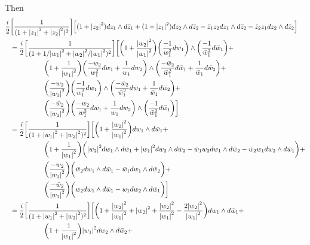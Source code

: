 \documentclass[11pt,leqno]{article}
\theoremstyle{plain}
\theoremstyle{definition}
\numberwithin{equation}{section}
\numberwithin{lem}{section}
\begin{document}
\begin{enumerate}
    Then 
    \begin{align*}
        \frac{i}{2}&\bigg[\frac{1}{(1+\abs{z_1}^2+\abs{z_2}^2)^2}\bigg]\Big[(1+\abs{z_2}^2)dz_1\wedge d\bar z_1 + (1+\abs{z_1}^2)dz_2\wedge d\bar z_2 - \bar z_1z_2dz_1\wedge d\bar z_2 - \bar z_2z_1dz_2\wedge d\bar z_2\Big] \\
        &= \frac{i}{2}\bigg[\frac{1}{(1+1/\abs{w_1}^2+\abs{w_2}^2/\abs{w_1}^2)^2}\bigg]\bigg[\bigg(1+\frac{\abs{w_2}^2}{\abs{w_1}^2}\bigg)\bigg(\frac{-1}{w_1^2}dw_1\bigg)\wedge\bigg(\frac{-1}{\bar w_1^2}d\bar w_1\bigg) + \\
        &\hspace{5em}\bigg(1+\frac{1}{\abs{w_1}^2}\bigg)\bigg(\frac{-w_2}{w_1^2}dw_1 + \frac{1}{w_1}dw_2\bigg)\wedge \bigg(\frac{-\bar w_2}{\bar w_1^2}d\bar w_1 + \frac{1}{\bar w_1}d\bar w_2\bigg) + \\
        &\hspace{5em}\bigg(\frac{-w_2}{\abs{w_1}^2}\bigg)\bigg(\frac{-1}{w_1^2}dw_1\bigg)\wedge\bigg(\frac{-\bar w_2}{\bar w_1^2}d\bar w_1 + \frac{1}{\bar w_1}d\bar w_2\bigg) +\\
        &\hspace{5em}\bigg(\frac{-\bar w_2}{\abs{w_1}^2}\bigg)\bigg(\frac{-w_2}{w_1^2}dw_1 + \frac{1}{w_1}dw_2\bigg)\wedge\bigg(\frac{-1}{\bar w_1^2}d\bar w_1\bigg)\bigg] \\
        &= \frac{i}{2}\bigg[\frac{1}{(1+\abs{w_1}^2+\abs{w_2}^2)^2}\bigg]\bigg[\bigg(1+\frac{\abs{w_2}^2}{\abs{w_1}^2}\bigg)dw_1\wedge d\bar w_1 + \\
        &\hspace{5em}\bigg(1+\frac{1}{\abs{w_1}^2}\bigg)\bigg(\abs{w_2}^2dw_1\wedge d\bar w_1 + \abs{w_1}^2dw_2\wedge d\bar w_2 - \bar w_1w_2dw_1\wedge d\bar w_2 - \bar w_2w_1dw_2\wedge d\bar w_1\bigg) + \\
        &\hspace{5em}\bigg(\frac{-w_2}{\abs{w_1}^2}\bigg)\bigg(\bar w_2dw_1\wedge d\bar w_1 - \bar w_1 dw_1\wedge d\bar w_2\bigg) +\\
        &\hspace{5em}\bigg(\frac{-\bar w_2}{\abs{w_1}^2}\bigg)\bigg(w_2dw_1\wedge d\bar w_1 - w_1dw_2\wedge d\bar w_1\bigg)\bigg]\\
        &= \frac{i}{2}\bigg[\frac{1}{(1+\abs{w_1}^2+\abs{w_2}^2)^2}\bigg]\bigg[\bigg(1+\frac{\abs{w_2}^2}{\abs{w_1}^2} + \abs{w_2}^2 + \frac{\abs{w_2}^2}{\abs{w_1}^2} - \frac{2\abs{w_2}^2}{\abs{w_1}^2}\bigg)dw_1\wedge d\bar w_1 + \\
        &\hspace{5em}\bigg(1+\frac{1}{\abs{w_1}^2}\bigg)\abs{w_1}^2dw_2\wedge d\bar w_2 + \\

\end{align*}
\end{enumerate}
\end{document}
